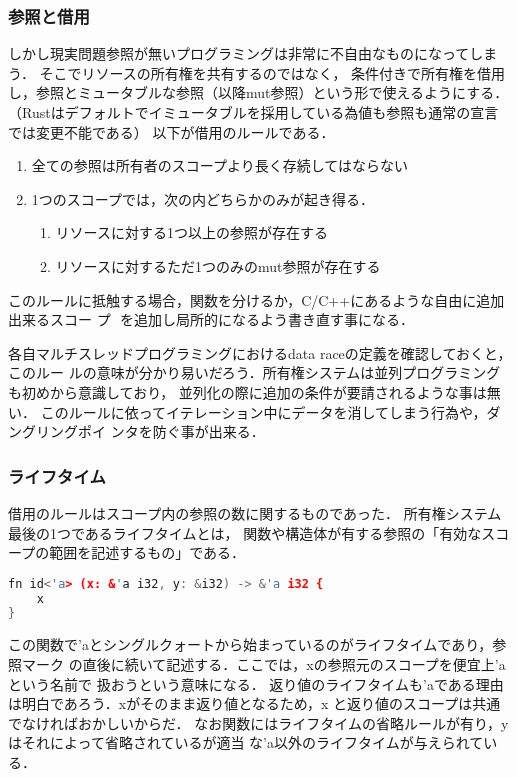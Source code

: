 \subsubsection{参照と借用}
しかし現実問題参照が無いプログラミングは非常に不自由なものになってしまう．
そこでリソースの所有権を共有するのではなく，
条件付きで所有権を借用し，参照とミュータブルな参照（以降mut参照）という形で使えるようにする．
（Rustはデフォルトでイミュータブルを採用している為値も参照も通常の宣言では変更不能である）
以下が借用のルールである．
\begin{enumerate}
  \item 全ての参照は所有者のスコープより長く存続してはならない
  \item 1つのスコープでは，次の内どちらかのみが起き得る．
    \begin{enumerate}
      \item リソースに対する1つ以上の参照が存在する
      \item リソースに対するただ1つのみのmut参照が存在する
    \end{enumerate}
\end{enumerate}
このルールに抵触する場合，関数を分けるか，C/C++にあるような自由に追加出来るスコー
プ ${}$ を追加し局所的になるよう書き直す事になる．

各自マルチスレッドプログラミングにおけるdata raceの定義を確認しておくと，このルー
ルの意味が分かり易いだろう．所有権システムは並列プログラミングも初めから意識しており，
並列化の際に追加の条件が要請されるような事は無い．
このルールに依ってイテレーション中にデータを消してしまう行為や，ダングリングポイ
ンタを防ぐ事が出来る．

\subsubsection{ライフタイム}
借用のルールはスコープ内の参照の数に関するものであった．
所有権システム最後の1つであるライフタイムとは，
関数や構造体が有する参照の「有効なスコープの範囲を記述するもの」である．

\begin{lstlisting}[language={C++},caption=関数のライフタイム,label=lifetime_fn]
fn id<'a> (x: &'a i32, y: &i32) -> &'a i32 {
    x
}
\end{lstlisting}

この関数で'aとシングルクォートから始まっているのがライフタイムであり，参照マーク
の直後に続いて記述する．ここでは，xの参照元のスコープを便宜上'aという名前で
扱おうという意味になる．
返り値のライフタイムも'aである理由は明白であろう．xがそのまま返り値となるため，x
と返り値のスコープは共通でなければおかしいからだ．
なお関数にはライフタイムの省略ルールが有り，yはそれによって省略されているが適当
な'a以外のライフタイムが与えられている．

